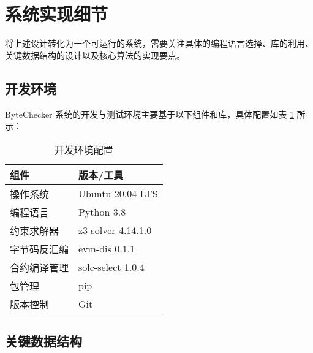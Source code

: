 \documentclass[print, master, vlined, timesmath]{DissertUESTC}
\begin{document}


\section{系统实现细节}

将上述设计转化为一个可运行的系统，需要关注具体的编程语言选择、库的利用、关键数据结构的设计以及核心算法的实现要点。

\subsection{开发环境}

ByteChecker 系统的开发与测试环境主要基于以下组件和库，具体配置如表 \ref{tab:dev_environment} 所示：

\begin{table}[H] %
    \centering
    \caption{开发环境配置}
    \label{tab:dev_environment}
    \begin{tabular}{ll}
        \toprule
        \textbf{组件} & \textbf{版本/工具} \\
        \midrule
        操作系统 & Ubuntu 20.04 LTS \\
        编程语言 & Python 3.8 \\
        约束求解器 & z3-solver 4.14.1.0 \\
        字节码反汇编 & evm-dis 0.1.1 \\
        合约编译管理 & solc-select 1.0.4 \\
        包管理 & pip \\
        版本控制 & Git \\
        \bottomrule
    \end{tabular}
\end{table}



\subsection{关键数据结构}
\end{document}
